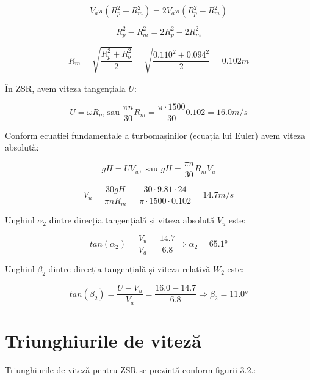 \begin{equation}
V_a \pi (R_p^2 - R_m^2) = 2 V_a \pi (R_p^2 - R_m^2) 
\end{equation}

\begin{equation}
R_p^2 - R_m^2 = 2 R_p^2 - 2 R_m^2
\end{equation}

\begin{equation}
R_m = \sqrt{\frac{R_p^2 + R_b^2}{2}} = \sqrt{\frac{0.110^2 + 0.094^2}{2}} = 0.102\si{m}
\end{equation}

În ZSR, avem viteza tangențiala $U$:

\begin{equation}
U = \omega R_m \text{ sau } \frac{\pi n}{30} R_m = \frac{\pi \cdot 1500}{30} 0.102 = 16.0 \si{m/s}
\end{equation}

Conform ecuației fundamentale a turbomașinilor (ecuația lui Euler) avem viteza absolută:

\begin{equation}
gH=UV_{u}, \text{ sau } gH=\frac{\pi n}{30} R_m V_{u}
\end{equation}

\begin{equation}
V_{u} = \frac{30gH}{\pi n R_m} = \frac{30 \cdot 9.81 \cdot 24 }{\pi \cdot 1500 \cdot 0.102} = 14.7 \si{m/s}
\end{equation}


Unghiul $\alpha_2$ dintre direcția tangențială și viteza absolută $V_u$ este:

\begin{equation}
tan(\alpha_{2 })=\frac{V_{u}}{V_{a}} = \frac{14.7}{6.8} \Rightarrow \alpha_{2}=65.1\si{\degree}
\end{equation}


Unghiul $\beta_2$ dintre direcția tangențială și viteza relativă $W_2$ este:

\begin{equation}
tan(\beta_{2})=\frac{U - V_u}{V_a} = \frac{16.0 - 14.7}{6.8} \Rightarrow \beta_{2} =11.0\si{\degree}
\end{equation}


\section{Triunghiurile de viteză}

Triunghiurile de viteză pentru ZSR se prezintă conform figurii 3.2.:

